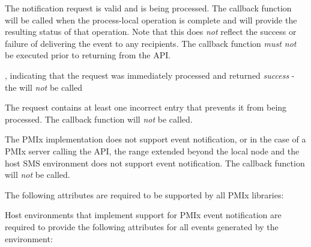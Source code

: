 \begin{arglist}
\end{arglist}

\begin{constantdesc}
\item {} The notification request is valid and is being processed. The callback function will be called when the process-local operation is complete and will provide the resulting status of that operation. Note that this does \textit{not} reflect the success or failure of delivering the event to any recipients. The callback function \emph{must not} be executed prior to returning from the \ac{API}.
\item {}, indicating that the request was immediately processed and returned \textit{success} - the  will \textit{not} be called
\item {} The request contains at least one incorrect entry that prevents it from being processed. The callback function will \textit{not} be called.
\item {} The \ac{PMIx} implementation does not support event notification, or in the case of a \ac{PMIx} server calling the API, the range extended beyond the local node and the host \ac{SMS} environment does not support event notification. The callback function will \textit{not} be called.
\end{constantdesc}

\reqattrstart
The following attributes are required to be supported by all \ac{PMIx} libraries:


Host environments that implement support for \ac{PMIx} event notification are required to provide the following attributes for all events generated by the environment:

